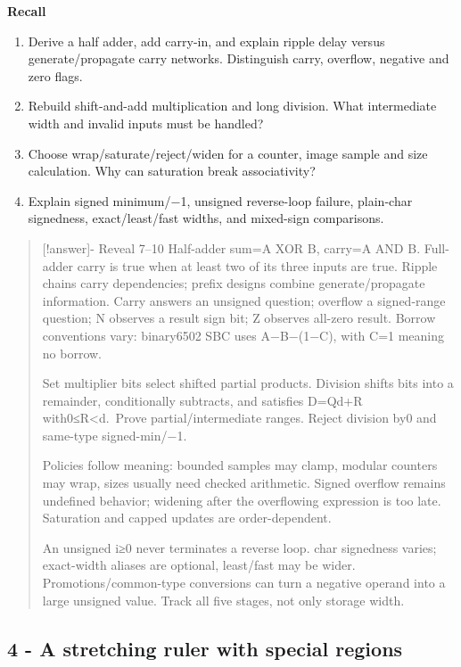 \textbf{Recall}

\begin{enumerate}
\def\labelenumi{\arabic{enumi}.}
\setcounter{enumi}{6}
\tightlist
\item
  Derive a half adder, add carry-in, and explain ripple delay versus generate/propagate carry networks. Distinguish carry, overflow, negative and zero flags.
\item
  Rebuild shift-and-add multiplication and long division. What intermediate width and invalid inputs must be handled?
\item
  Choose wrap/saturate/reject/widen for a counter, image sample and size calculation. Why can saturation break associativity?
\item
  Explain signed minimum/−1, unsigned reverse-loop failure, plain-char signedness, exact/least/fast widths, and mixed-sign comparisons.
\end{enumerate}

\begin{quote}
{[}!answer{]}- Reveal 7--10 Half-adder sum=A XOR B, carry=A AND B. Full-adder carry is true when at least two of its three inputs are true. Ripple chains carry dependencies; prefix designs combine generate/propagate information. Carry answers an unsigned question; overflow a signed-range question; N observes a result sign bit; Z observes all-zero result. Borrow conventions vary: binary6502 SBC uses A−B−(1−C), with C=1 meaning no borrow.

Set multiplier bits select shifted partial products. Division shifts bits into a remainder, conditionally subtracts, and satisfies D=Qd+R with0≤R\textless d.~Prove partial/intermediate ranges. Reject division by0 and same-type signed-min/−1.

Policies follow meaning: bounded samples may clamp, modular counters may wrap, sizes usually need checked arithmetic. Signed overflow remains undefined behavior; widening after the overflowing expression is too late. Saturation and capped updates are order-dependent.

An unsigned i≥0 never terminates a reverse loop. char signedness varies; exact-width aliases are optional, least/fast may be wider. Promotions/common-type conversions can turn a negative operand into a large unsigned value. Track all five stages, not only storage width.
\end{quote}

\subsection{4 - A stretching ruler with special regions}\label{appendix-ef4d27797a92-a-stretching-ruler-with-special-regions}


